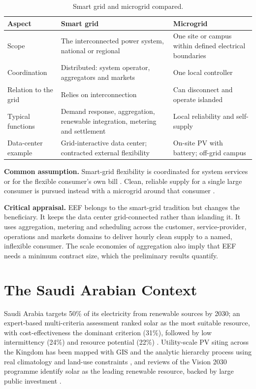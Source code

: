 \begin{table}[!htbp]
\centering
\caption{Smart grid and microgrid compared.}
\label{tab:2.1}
\small
\renewcommand{\arraystretch}{1.2}
\begin{tabularx}{\textwidth}{>{\raggedright\arraybackslash}p{3.2cm}>{\raggedright\arraybackslash}X>{\raggedright\arraybackslash}X}
\toprule
\textbf{Aspect} & \textbf{Smart grid} & \textbf{Microgrid} \\
\midrule
Scope & The interconnected power system, national or regional & One site or campus within defined electrical boundaries \\
Coordination & Distributed: system operator, aggregators and markets & One local controller \\
Relation to the grid & Relies on interconnection & Can disconnect and operate islanded \\
Typical functions & Demand response, aggregation, renewable integration, metering and settlement & Local reliability and self-supply \\
Data-center example & Grid-interactive data center; contracted external flexibility & On-site PV with battery; off-grid campus \\
\bottomrule
\end{tabularx}
\end{table}

\textbf{Common assumption.} Smart-grid flexibility is coordinated for system services or for the flexible consumer's own bill \cite{r57,r59}. Clean, reliable supply for a single large consumer is pursued instead with a microgrid around that consumer \cite{r61}.

\textbf{Critical appraisal.} EEF belongs to the smart-grid tradition but changes the beneficiary. It keeps the data center grid-connected rather than islanding it. It uses aggregation, metering and scheduling across the customer, service-provider, operations and markets domains \cite{r54} to deliver hourly clean supply to a named, inflexible consumer. The scale economies of aggregation \cite{r59} also imply that EEF needs a minimum contract size, which the preliminary results quantify.

\section{The Saudi Arabian Context}\label{sec:2-10}

Saudi Arabia targets 50\% of its electricity from renewable sources by 2030; an expert-based multi-criteria assessment ranked solar as the most suitable resource, with cost-effectiveness the dominant criterion (31\%), followed by low intermittency (24\%) and resource potential (22\%) \cite{r36}. Utility-scale PV siting across the Kingdom has been mapped with GIS and the analytic hierarchy process using real climatology and land-use constraints \cite{r37}, and reviews of the Vision 2030 programme identify solar as the leading renewable resource, backed by large public investment \cite{r48}.

